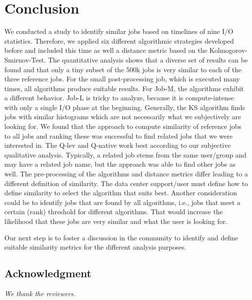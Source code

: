 \documentclass{jhps}
\begin{document}
\section{Conclusion}%
\label{sec:summary}

We conducted a study to identify similar jobs based on timelines of nine I/O statistics.
Therefore, we applied six different algorithmic strategies developed before and included this time as well a distance metric based on the Kolmogorov-Smirnov-Test.
The quantitative analysis shows that a diverse set of results can be found and that only a tiny subset of the 500k jobs is very similar to each of the three reference jobs.
For the small post-processing job, which is executed many times, all algorithms produce suitable results.
For Job-M, the algorithms exhibit a different behavior.
Job-L is tricky to analyze, because it is compute-intense with only a single I/O phase at the beginning.
Generally, the KS algorithm finds jobs with similar histograms which are not necessarily what we subjectively are looking for.
We found that the approach to compute similarity of reference jobs to all jobs and ranking these was successful to find related jobs that we were interested in.
The Q-lev and Q-native work best according to our subjective qualitative analysis.
Typically, a related job stems from the same user/group and may have a related job name, but the approach was able to find other jobs as well.
The pre-processing of the algorithms and distance metrics differ leading to a different definition of similarity.
The data center support/user must define how to define similarity to select the algorithm that suits best.
Another consideration could be to identify jobs that are found by all algorithms, i.e., jobs that meet a certain (rank) threshold for different algorithms.
That would increase the likelihood that these jobs are very similar and what the user is looking for.

Our next step is to foster a discussion in the community to identify and define suitable similarity metrics for the different analysis purposes.



\subsection*{Acknowledgment} %
\textit{We thank the reviewers.}


\end{document}
